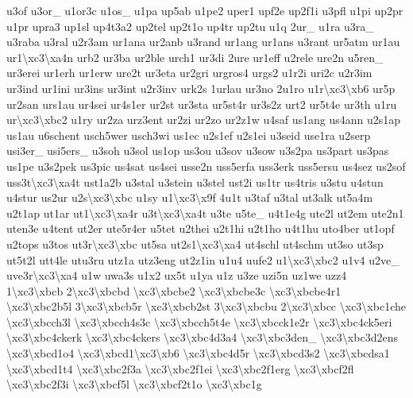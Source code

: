{u3of u3or\-\_\- u1or3c u1os\-\_\- u1pa up5ab u1pe2 uper1 upf2e up2f1i u3pfl u1pi up2pr u1pr upra3 up1sl up4t3a2 up2tel up2t1o up4tr up2tu u1q 2ur\-\_\- u1ra u3ra\-\_\- u3raba u3ral u2r3am ur1ana ur2anb u3rand ur1ang ur1ans u3rant ur5atm ur1au ur1\textbackslash{}xc3\textbackslash{}xa4n urb2 ur3ba ur2ble urch1 ur3di 2ure ur1eff u2rele ure2n u5ren\-\_\- ur3erei ur1erh ur1erw ure2t ur3eta ur2gri urgros4 urgs2 u1r2i uri2c u2r3im ur3ind ur1ini ur3ins ur3int u2r3inv urk2s 1urlau ur3no 2u1ro u1r\textbackslash{}xc3\textbackslash{}xb6 ur5p ur2san urs1au ur4sei ur4s1er ur2st ur3sta ur5st4r ur3s2z urt2 ur5t4e ur3th u1ru ur\textbackslash{}xc3\textbackslash{}xbc2 u1ry ur2za urz3ent ur2zi ur2zo ur2z1w u4saf us1ang us4ann u2s1ap us1au u6schent usch5wer usch3wi us1ec u2s1ef u2s1ei u3seid use1ra u2serp usi3er\-\_\- usi5ers\-\_\- u3soh u3sol us1op us3ou u3sov u3sow u3s2pa us3part us3pas us1pe u3s2pek us3pic us4sat us4sei usse2n uss5erfa uss3erk uss5ersu us4sez us2sof uss3t\textbackslash{}xc3\textbackslash{}xa4t ust1a2b u3stal u3stein u3stel ust2i us1tr us4tris u3stu u4stun u4stur us2ur u2s\textbackslash{}xc3\textbackslash{}xbc u1sy u1\textbackslash{}xc3\textbackslash{}x9f 4u1t u3taf u3tal ut3alk ut5a4m u2t1ap ut1ar ut1\textbackslash{}xc3\textbackslash{}xa4r u3t\textbackslash{}xc3\textbackslash{}xa4t u3te u5te\-\_\- u4t1e4g ute2l ut2em ute2n1 uten3e u4tent ut2er ute5r4er u5tet u2thei u2t1hi u2t1ho u4t1hu uto4ber ut1opf u2tops u3tos ut3r\textbackslash{}xc3\textbackslash{}xbc ut5sa ut2s1\textbackslash{}xc3\textbackslash{}xa4 ut4schl ut4schm ut3so ut3sp ut5t2l utt4le utu3ru utz1a utz3eng ut2z1in u1u4 uufe2 u1\textbackslash{}xc3\textbackslash{}xbc2 u1v4 u2ve\-\_\- uve3r\textbackslash{}xc3\textbackslash{}xa4 u1w uwa3s u1x2 ux5t u1ya u1z u3ze uzi5n uz1we uzz4 1\textbackslash{}xc3\textbackslash{}xbcb 2\textbackslash{}xc3\textbackslash{}xbcbd \textbackslash{}xc3\textbackslash{}xbcbe2 \textbackslash{}xc3\textbackslash{}xbcbe3c \textbackslash{}xc3\textbackslash{}xbcbe4r1 \textbackslash{}xc3\textbackslash{}xbc2b5l 3\textbackslash{}xc3\textbackslash{}xbcb5r \textbackslash{}xc3\textbackslash{}xbcb2st 3\textbackslash{}xc3\textbackslash{}xbcbu 2\textbackslash{}xc3\textbackslash{}xbcc \textbackslash{}xc3\textbackslash{}xbc1che \textbackslash{}xc3\textbackslash{}xbcch3l \textbackslash{}xc3\textbackslash{}xbcch4s3c \textbackslash{}xc3\textbackslash{}xbcch5t4e \textbackslash{}xc3\textbackslash{}xbcck1e2r \textbackslash{}xc3\textbackslash{}xbc4ck5eri \textbackslash{}xc3\textbackslash{}xbc4ckerk \textbackslash{}xc3\textbackslash{}xbc4ckers \textbackslash{}xc3\textbackslash{}xbc4d3a4 \textbackslash{}xc3\textbackslash{}xbc3den\-\_\- \textbackslash{}xc3\textbackslash{}xbc3d2ens \textbackslash{}xc3\textbackslash{}xbcd1o4 \textbackslash{}xc3\textbackslash{}xbcd1\textbackslash{}xc3\textbackslash{}xb6 \textbackslash{}xc3\textbackslash{}xbc4d5r \textbackslash{}xc3\textbackslash{}xbcd3s2 \textbackslash{}xc3\textbackslash{}xbcdsa1 \textbackslash{}xc3\textbackslash{}xbcd1t4 \textbackslash{}xc3\textbackslash{}xbc2f3a \textbackslash{}xc3\textbackslash{}xbc2f1ei \textbackslash{}xc3\textbackslash{}xbc2f1erg \textbackslash{}xc3\textbackslash{}xbcf2fl \textbackslash{}xc3\textbackslash{}xbc2f3i \textbackslash{}xc3\textbackslash{}xbcf5l \textbackslash{}xc3\textbackslash{}xbcf2t1o \textbackslash{}xc3\textbackslash{}xbc1g }
